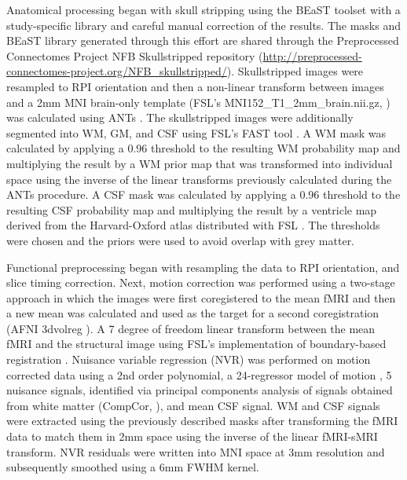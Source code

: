 Anatomical processing began with skull stripping using the BEaST toolset \cite{Eskildsen_2012} with a study-specific library and careful manual correction of the results. The masks and BEaST library generated through this effort are shared through the Preprocessed Connectomes Project NFB Skullstripped repository (\href{http://preprocessed-connectomes-project.org/NFB_skullstripped/}{http://preprocessed-connectomes-project.org/NFB\_skullstripped/})\cite{Puccio_2016}. Skullstripped images were resampled to RPI orientation and then a non-linear transform between images and a 2mm MNI brain-only template (FSL's MNI152\_T1\_2mm\_brain.nii.gz, \cite{Smith2004}) was calculated using ANTs \cite{Avants_2008}. The skullstripped images were additionally segmented into WM, GM, and CSF using FSL's FAST tool \cite{Zhang2001}. A WM mask was calculated by applying a 0.96 threshold to the resulting WM probability map and multiplying the result by a WM prior map that was transformed into individual space using the inverse of the linear transforms previously calculated during the ANTs procedure. A CSF mask was calculated by applying a 0.96 threshold to the resulting CSF probability map and multiplying the result by a ventricle map derived from the Harvard-Oxford atlas distributed with FSL \cite{Makris_2006}. The thresholds were chosen and the priors were used to avoid overlap with grey matter.

Functional preprocessing began with resampling the data to RPI orientation, and slice timing correction. Next, motion correction was performed using a two-stage approach in which the images were first coregistered to the mean fMRI and then a new mean was calculated and used as the target for a second coregistration (AFNI 3dvolreg \cite{Cox_1999}). A 7 degree of freedom linear transform between the mean fMRI and the structural image using FSL's implementation of boundary-based registration \cite{Greve2009}. Nuisance variable regression (NVR) was performed on motion corrected data using a 2nd order polynomial, a 24-regressor model of motion \cite{Friston1996a}, 5 nuisance signals, identified via principal components analysis of signals obtained from white matter (CompCor, \cite{Behzadi2007}), and mean CSF signal. WM and CSF signals were extracted using the previously described masks after transforming the fMRI data to match them in 2mm space using the inverse of the linear fMRI-sMRI transform. NVR residuals were written into MNI space at 3mm resolution and subsequently smoothed using a 6mm FWHM kernel.




